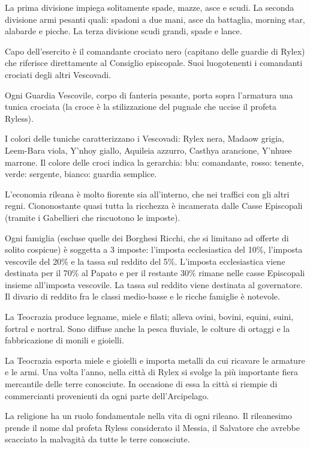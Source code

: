 La prima divisione impiega solitamente spade, mazze, asce e scudi.
La seconda divisione armi pesanti quali: spadoni a due mani, asce da
battaglia, morning star, alabarde e picche.  La terza divisione scudi
grandi, spade e lance. 

Capo dell'esercito \`e il comandante crociato nero (capitano delle
guardie di Rylex) che riferisce direttamente al Consiglio episcopale.
Suoi luogotenenti i comandanti crociati degli altri Vescovadi.

Ogni Guardia Vescovile, corpo di fanteria pesante,
porta sopra l'armatura una tunica crociata (la croce \`e la
stilizzazione del pugnale che uccise il profeta Ryless). 

I colori delle tuniche caratterizzano i Vescovadi: Rylex nera, Madaow
grigia, Leem-Bara viola, Y'nhoy giallo, Aquileia azzurro, Casthya
arancione, Y'nhuee marrone. Il colore delle croci indica la gerarchia:
blu: comandante, rosso: tenente, verde: sergente, bianco: guardia
semplice.

\Economia L'economia rileana \`e molto fiorente sia all'interno, che
nei traffici con gli altri regni.  Ciononostante quasi tutta la
ricchezza \`e incamerata dalle Casse Episcopali (tramite i Gabellieri
che riscuotono le imposte).

Ogni famiglia (escluse quelle dei Borghesi Ricchi, che si limitano ad
offerte di solito cospicue) \`e soggetta a 3 imposte: l'imposta
ecclesiastica del 10\%, l'imposta vescovile del 20\% e la tassa sul
reddito del 5\%.  L'imposta ecclesiastica viene destinata per il 70\%
al Papato e per il restante 30\% rimane nelle casse Episcopali insieme
all'imposta vescovile.  La tassa sul reddito viene destinata al
governatore. Il divario di reddito fra le classi medio-basse e le
ricche famiglie \`e notevole.

La Teocrazia produce legname, miele e filati; alleva ovini, bovini,
equini, suini, fortral e nortral. Sono diffuse anche la pesca
fluviale, le colture di ortaggi e la fabbricazione di monili e
gioielli.

La Teocrazia esporta miele e gioielli e importa metalli da cui
ricavare le armature e le armi. Una volta l'anno, nella citt\`a di
Rylex si svolge la pi\`u importante fiera mercantile delle terre
conosciute. In occasione di essa la citt\`a si riempie di commercianti
provenienti da ogni parte dell'Arcipelago.

\Religione La religione ha un ruolo fondamentale nella vita di
ogni rileano. Il rileanesimo prende il nome dal profeta Ryless
considerato il Messia, il Salvatore che avrebbe scacciato la
malvagit\`a da tutte le terre conosciute.

